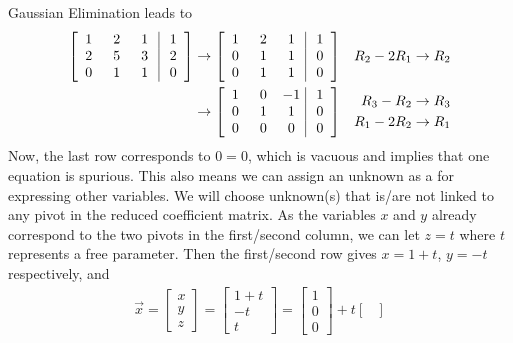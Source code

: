 \begin{solution} 
Gaussian Elimination leads to
\begin{align*}
\left[\begin{array}{@{\;}wc{10pt}wc{10pt}wc{10pt}|wc{10pt}@{\;}}
1 & 2 & 1 & 1 \\
2 & 5 & 3 & 2 \\
0 & 1 & 1 & 0
\end{array}\right] 
& \to 
\left[\begin{array}{@{\;}wc{10pt}wc{10pt}wc{10pt}|wc{10pt}@{\;}}
1 & 2 & 1 & 1 \\
0 & 1 & 1 & 0 \\
0 & 1 & 1 & 0
\end{array}\right] 
& R_2 - 2R_1 \to R_2 \\
& \to 
\left[\begin{array}{@{\;}wc{10pt}wc{10pt}wc{10pt}|wc{10pt}@{\;}}
1 & 0 & -1 & 1 \\
0 & 1 & 1 & 0 \\
0 & 0 & 0 & 0
\end{array}\right] 
& \begin{aligned}
R_3-R_2 &\to R_3 \\
R_1-2R_2 &\to R_1    
\end{aligned}
\end{align*}
Now, the last row corresponds to $0 = 0$, which is vacuous and implies that one equation is spurious. This also means we can assign an unknown as a  for expressing other variables. We will choose unknown(s) that is/are not linked to any pivot in the reduced coefficient matrix. As the variables $x$ and $y$ already correspond to the two pivots in the first/second column, we can let $z = t$ where $t$ represents a free parameter. Then the first/second row gives $x = 1+t$, $y = -t$ respectively, and
\begin{align*}
\vec{x} = 
\begin{bmatrix}
x \\
y \\
z
\end{bmatrix}
=
\begin{bmatrix}
1+t \\
-t \\
t
\end{bmatrix}
=
\begin{bmatrix}
1 \\
0 \\
0
\end{bmatrix}
+ t
\begin{bmatrix}

\end{bmatrix}
\end{align*}
\end{solution}
